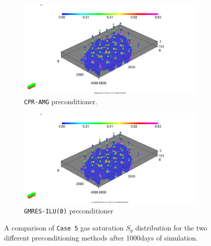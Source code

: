 \begin{figure}[h!]
\centering
\begin{subfigure}{.5\textwidth}
  \centering
  \includegraphics[width=1.3\linewidth]{figures/Case9_CPR_Sg.png}
  \caption{\texttt{CPR-AMG} preconditioner.}
\end{subfigure}%
\begin{subfigure}{.5\textwidth}
  \centering
  \includegraphics[width=1.3\linewidth]{figures/Case9_ILU-GMRES_Sg.png}
  \caption{\texttt{GMRES-ILU(0)} preconditioner}
\end{subfigure}
\caption{A comparison of \texttt{Case 5} gas saturation $S_{g}$ distribution for the two different preconditioning methods after 1000days of simulation.}
\label{case5sg}
\end{figure}

